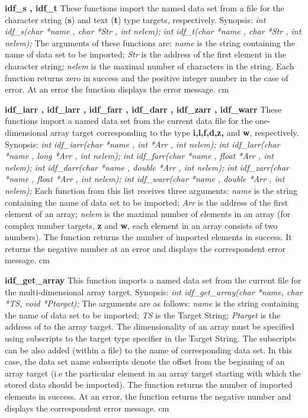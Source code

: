 {
{\bf idf\_s , idf\_t}\hfil\break
These functions import the named data set from a file 
for the character string ({\bf s}) and text ({\bf t}) type targets, 
respectively. 
Synopsis:\hfil\break
{\it int idf\_s(char *name , char *Str , int nelem);}\hfil\break
{\it int idf\_t(char *name , char *Str , int nelem);}\hfil\break
The arguments of these functions are: 
{\it name} is the string containing the name of data set to be imported;
{\it Str} is the address of the first element in the character string;
{\it nelem} is the maximal number of characters in the string.
Each function returns zero in success
and the positive integer number in the case of error.
At an error the function displays the error message. 
}
 cm

{
{\bf idf\_iarr , idf\_larr , idf\_farr , idf\_darr , idf\_zarr ,
idf\_warr}\hfil\break
These functions import a named data set from the current data file 
for the one-dimensional array target 
corresponding to the type {\bf i,l,f,d,z,} and {\bf w}, respectively. 
Synopsis:\hfil\break
{\it int idf\_iarr(char *name , int *Arr , int nelem);}\hfil\break
{\it int idf\_larr(char *name , long *Arr , int nelem);}\hfil\break
{\it int idf\_farr(char *name , float *Arr , int nelem);}\hfil\break
{\it int idf\_darr(char *name , double *Arr , int nelem);}\hfil\break
{\it int idf\_zarr(char *name , float *Arr , int nelem);}\hfil\break
{\it int idf\_warr(char *name , double *Arr , int nelem);}\hfil\break
Each function from this list receives three arguments:
{\it name} is the string containing the name of data set to be imported;
{\it Arr} is the address of the first element of an array; 
{\it nelem} is the maximal number of elements in an array 
(for complex number targets, {\bf z} and {\bf w}, each
element in an array consists of two numbers).
The function returns the number of imported elements in success.
It returns the negative number at an error
and displays the correspondent error message.
}
 cm


{
{\bf idf\_get\_array}\hfil\break
This function imports a named data set from the current file 
for the multi-dimensional array target.
Synopsis:\hfil\break
{\it int idf\_get\_array(char *name, char *TS, void *Ptarget);}\hfil\break
The arguments are as follows: {\it name} is the string containing 
the name of data set to be imported;
{\it TS} is the Target String;
{\it Ptarget} is the address of to the array target.
The dimensionality of an array must be specified 
using subscripts to the target type specifier in the Target String. 
The subscripts can be also added (within a file) to the name 
of corresponding data set. In this case, the data set name
subscripts denote the offset from the beginning of an array target
(i.e the particular element in an array target starting with which
the stored data should be imported).
The function returns the number of imported elements in success.
At an error, the function returns the negative number 
and displays the correspondent error message.
}
 cm

